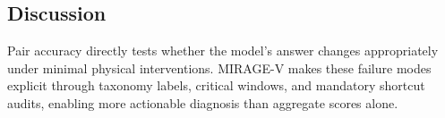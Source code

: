 \begin{table}[t]
  \centering
  \small
  \caption{Per-module pair accuracy (\%, higher is better). Each module contains 50 minimal-change pairs.}
  \label{tab:by-module-pair-accuracy}
  
\end{table}

\subsection{Discussion}
Pair accuracy directly tests whether the model's answer changes appropriately under minimal physical interventions.
MIRAGE-V makes these failure modes explicit through taxonomy labels, critical windows, and mandatory shortcut audits, enabling more actionable diagnosis than aggregate scores alone.
